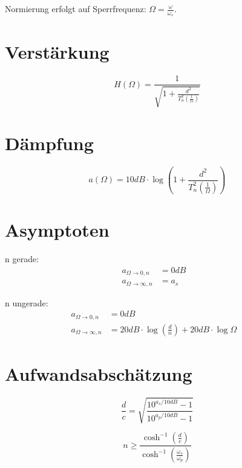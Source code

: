 \documentclass[a4paper, 12pt]{report}
\begin{document}
	Normierung erfolgt auf Sperrfrequenz: $ \Omega = \frac{\omega}{\omega_s} $.
	\vspace{0.5cm}

\begin{minipage}[t]{0.4\textwidth}
	\section*{Verstärkung}
	    \[ H(\Omega) = \frac{1}{\sqrt{1 + \frac{d^2}{T^2_n\left(\frac{1}{\Omega}\right)}}} \]
\end{minipage}
\begin{minipage}[t]{0.6\textwidth}
\section*{Dämpfung}
	    \[ a(\Omega) = 10dB \cdot \log{\left(1 + \frac{d^2}{T^2_n\left(\frac{1}{\Omega}\right)}\right)} \]
\end{minipage}

\section*{Asymptoten}
   	\begin{minipage}[t]{0.5\textwidth}
		n gerade:
		\begin{align*}
			a_{\Omega\rightarrow 0,n} &= 0 dB &\\
			a_{\Omega\rightarrow \infty,n} &= a_s &
		\end{align*}
   	\end{minipage}
   	\begin{minipage}[t]{0.5\textwidth}
		n ungerade:
		\begin{align*}
			a_{\Omega\rightarrow 0,n} &= 0 dB &\\
			a_{\Omega\rightarrow \infty,n} &= 20dB\cdot \log \left(\frac{d}{n}\right) + 20dB \cdot \log \Omega &
		\end{align*}
   	\end{minipage}
	
\section*{Aufwandsabschätzung}
	\vspace{-0.5cm}
   	\begin{minipage}[t]{0.5\textwidth}
		\[ \frac{d}{c} = \sqrt{\frac{10^{a_s/10dB} - 1}{10^{a_p/10dB} - 1}} \]
   	\end{minipage}
   	\begin{minipage}[t]{0.5\textwidth}
		\[ n \ge \frac{\cosh^{-1}{\left(\frac{d}{c}\right)}}{\cosh^{-1}{\left(\frac{\omega_s}{\omega_p}\right)}} \]
   	\end{minipage}
   	\vspace{0cm}
   	
\end{document}
